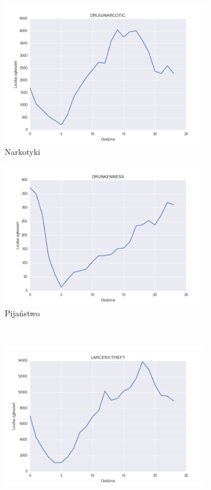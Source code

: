 \documentclass[11pt]{article} %
\begin{document}
\begin{figure}[h]
\begin{subfigure}{0.48\linewidth}
   \includegraphics[width=\linewidth]{images/crimes_per_hour/7}
   \caption{Narkotyki}
   \label{fig:crimes_per_hour_3}
\end{subfigure}
\hfill
\begin{subfigure}{0.48\linewidth}
   \centering
   \includegraphics[width=\linewidth]{images/crimes_per_hour/8}
   \caption{Pijaństwo}
   \label{fig:crimes_per_hour_4}
\end{subfigure}
\\[\baselineskip]
   \begin{subfigure}{0.48\linewidth}
   \centering
   \includegraphics[width=\linewidth]{images/crimes_per_hour/16}

\end{subfigure}
\end{figure}
\end{document}
